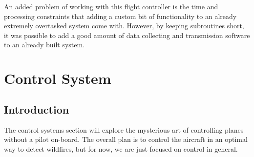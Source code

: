 \documentclass[12pt,journal,compsoc]{IEEEtran}
\begin{document}
An added problem of working with this flight controller is the time and processing constraints that adding a custom bit of functionality to an already extremely overtasked system come with. However, by keeping subroutines short, it was possible to add a good amount of data collecting and transmission software to an already built system.

\section{Control System}
\subsection{Introduction}
The control systems section will explore the mysterious art of controlling planes without a pilot on-board. The overall plan is to control the aircraft in an optimal way to detect wildfires, but for now, we are just focused on control in general.
\end{document}
